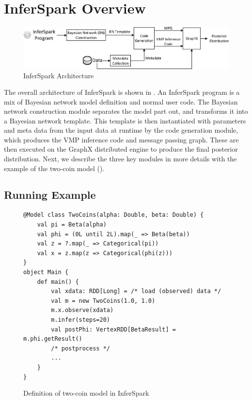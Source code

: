 \section{InferSpark Overview}
\label{sec:framework}

\begin{figure}[th]
	\centering
	\includegraphics[width=1.6\columnwidth]{figs/workflow2.eps}
	\caption{InferSpark Architecture}
	\label{fig:workflow}
\end{figure}


The overall architecture of InferSpark is shown in . 
An InferSpark program is a mix of Bayesian network model definition and
normal user code. The Bayesian network construction module separates the
model part out, and transforms it into a Bayesian network template. This
template is then instantiated with parameters and meta data from the input
data at runtime by the code generation module, which produces the VMP inference
code and message passing graph. These are then executed on the GraphX 
distributed engine to produce the final posterior distribution.
Next, we describe the three key modules in more details with 
the example of the two-coin model ().

\subsection{Running Example}

\begin{figure}[h]
\begin{lstlisting}
@Model class TwoCoins(alpha: Double, beta: Double) {
	val pi = Beta(alpha)
	val phi = (0L until 2L).map(_ => Beta(beta))
	val z = ?.map(_ => Categorical(pi))
	val x = z.map(z => Categorical(phi(z)))
}
object Main {
	def main() {
		val xdata: RDD[Long] = /* load (observed) data */
		val m = new TwoCoins(1.0, 1.0)
		m.x.observe(xdata)
		m.infer(steps=20)
		val postPhi: VertexRDD[BetaResult] = m.phi.getResult()
		/* postprocess */
		...
	}
}
\end{lstlisting}
\caption{Definition of two-coin model in InferSpark}
\label{fig:two_coins_modeldef}
\end{figure}

